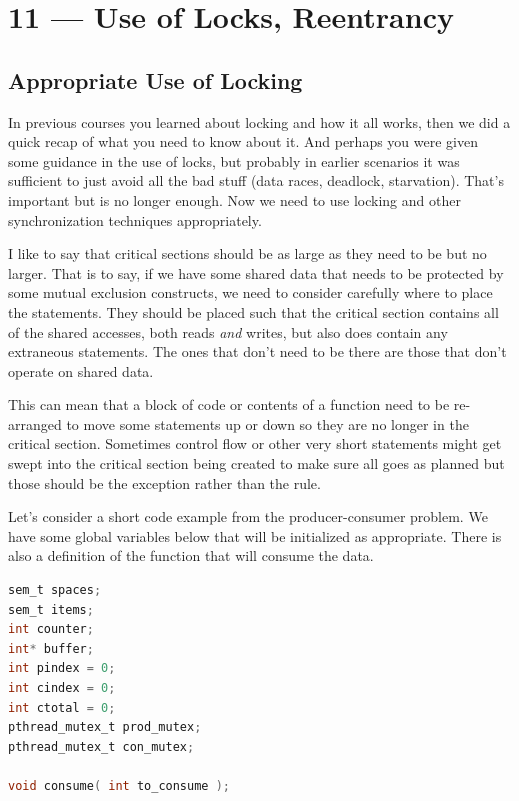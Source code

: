 \documentclass[a4paper]{report}
\begin{document}
\chapter*{11 --- Use of Locks, Reentrancy}


\section*{Appropriate Use of Locking}

In previous courses you learned about locking and how it all works, then we did a quick recap of what you need to know about it. And perhaps you were given some guidance in the use of locks, but probably in earlier scenarios it was sufficient to just avoid all the bad stuff (data races, deadlock, starvation). That's important but is no longer enough. Now we need to use locking and other synchronization techniques appropriately. 

I like to say that critical sections should be as large as they need to be but no larger. That is to say, if we have some shared data that needs to be protected by some mutual exclusion constructs, we need to consider carefully where to place the statements. They should be placed such that the critical section contains all of the shared accesses, both reads \textit{and} writes, but also does contain any extraneous statements. The ones that don't need to be there are those that don't operate on shared data. 

This can mean that a block of code or contents of a function need to be re-arranged to move some statements up or down so they are no longer in the critical section. Sometimes control flow or other very short statements might get swept into the critical section being created to make sure all goes as planned but those should be the exception rather than the rule.

Let's consider a short code example from the producer-consumer problem. We have some global variables below that will be initialized as appropriate. There is also a definition of the function that will consume the data.

\begin{lstlisting}[language=C]
sem_t spaces;
sem_t items;
int counter;
int* buffer;
int pindex = 0;
int cindex = 0;
int ctotal = 0;
pthread_mutex_t prod_mutex;
pthread_mutex_t con_mutex;

void consume( int to_consume );

\end{lstlisting}
\end{document}
